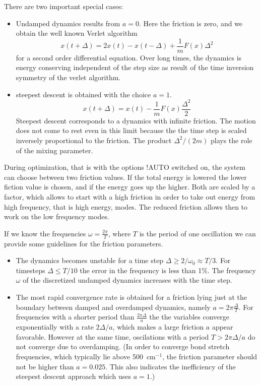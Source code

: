 \documentclass[final,12pt]{article}
\begin{document}
{{{{{{There are two important special cases:
\begin{itemize}
\item Undamped dynamics results from $a=0$. Here the friction is zero,
and we obtain the well known Verlet algorithm
\begin{displaymath}
x(t+\Delta)=2x(t)-x(t-\Delta)+\frac{1}{m}F(x)\Delta^2
\end{displaymath}
  for a second order differential equation. Over long times, the
  dynamics is energy conserving independent of the step size as result
  of the time inversion symmetry of the verlet algorithm.
\item steepest descent is obtained with the choice $a=1$.
   \begin{displaymath}
    x(t+\Delta)=x(t)-\frac{1}{m}F(x)\frac{\Delta^2}{2}
    \end{displaymath}
      Steepest descent corresponds to a dynamics with infinite
      friction.  The motion does not come to rest even in this limit
      because the the time step is scaled inversely proportional to
      the friction. The product $\Delta^2/(2m)$ plays the role of the
      mixing parameter.
\end{itemize}


During optimization, that is with the options !AUTO switched on, the
system can choose between two friction values. If the total energy is
lowered the lower fiction value is chosen, and if the energy goes up
the higher. Both are scaled by a factor, which allows to start with a
high friction in order to take out energy from high frequency, that is
high energy, modes. The reduced friction allows then to work on the
low frequency modes.


If we know the frequencies $\omega=\frac{2\pi}{T}$, where $T$ is the
period of one oscillation we can provide some guidelines for the
friction parameters.
\begin{itemize}
\item The dynamics becomes unstable for a time step $\Delta\ge
    2/\omega_0\approx T/3$. For timesteps $\Delta\le T/10$ the error
    in the frequency is less than 1\%.  The frequency $\omega$ of the
    discretized undamped dynamics increases with the time step.
\item The most rapid convergence rate is obtained for a friction
    lying just at the boundary between damped and overdamped dynamics,
    namely $a=2\pi\frac{\Delta}{T}$. For frequencies with a shorter
    period than $\frac{2\pi\Delta}{a}$ the the variables converge
    exponentially with a rate $2\Delta/a$, which makes a large
    friction $a$ appear favorable.  However at the same time,
    oscilations with a period $T>2\pi\Delta/a$ do not converge due to
    overdamping. (In order to converge bond stretch frequencies, which
    typically lie above 500~cm$^{-1}$, the friction parameter should
    not be higher than $a=0.025$. This also indicates the inefficiency
    of the steepest descent approach which uses $a=1$.)
\end{itemize}

}}}}}}
\end{document}
